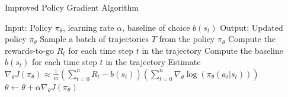 \documentclass{article} %
\theoremstyle{definition}
\begin{document}
\begin{algorithm}[H] 
    \caption{Improved Policy Gradient Algorithm}
    \label{alg:reinforce}
    \begin{algorithmic}[1]
        \State Input: Policy $\pi_\theta$, learning rate $\alpha$, baseline of choice $b(s_t)$
        \State Output: Updated policy $\pi_\theta$
            \State Sample a batch of trajectories $T$ from the policy $\pi_\theta$
                \State Compute the rewards-to-go $R_t$ for each time step $t$ in the trajectory
                \State Compute the baseline $b(s_t)$ for each time step $t$ in the trajectory
                \State Estimate $\nabla_\theta J(\pi_\theta) \approx \frac{1}{m} \left(\sum_{t = 0}^{n} R_t - b(s_t)\right) \left( \sum_{t=0}^{n} \nabla_\theta \log(\pi_\theta(a_t | s_t)) \right)$
            \EndFor
            \State $\theta \leftarrow \theta + \alpha \nabla_\theta J(\pi_\theta)$
        \EndWhile
    \end{algorithmic}
\end{algorithm}
\end{document}
